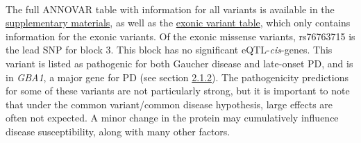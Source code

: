 \documentclass{article}
\begin{document}
\\The full ANNOVAR table with information for all variants is available in the \href{https://github.com/Thomas-brightwell/PD-MSc-project-code/blob/main/Thesis/Supplementary%20materials/HighLDvariants.avinput.variant_function}{supplementary materials}, as well as the \href{https://github.com/Thomas-brightwell/PD-MSc-project-code/blob/main/Thesis/Supplementary%20materials/HighLDvariants.avinput.exonic_variant_function}{exonic variant table}, which only contains information for the exonic variants. Of the exonic missense variants, rs76763715 is the lead SNP for block 3. This block has no significant eQTL-\textit{cis}-genes. This variant is listed as pathogenic for both Gaucher disease and late-onset PD, and is in \textit{GBA1}, a major gene for PD (see section \hyperref[subsubsec:PDtypes]{2.1.2}). The pathogenicity predictions for some of these variants are not particularly strong, but it is important to note that under the common variant/common disease hypothesis, large effects are often not expected. A minor change in the protein may cumulatively influence disease susceptibility, along with many other factors.
\end{document}
